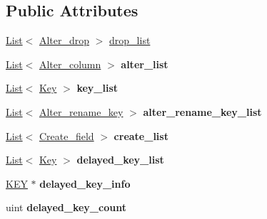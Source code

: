 \subsection*{Public Attributes}
\begin{DoxyCompactItemize}
\item 
\mbox{\hyperlink{classList}{List}}$<$ \mbox{\hyperlink{classAlter__drop}{Alter\+\_\+drop}} $>$ \mbox{\hyperlink{classAlter__info_a4bc7d6d9511a71d514d57cd07c9cafe8}{drop\+\_\+list}}
\item 
\mbox{\label{classAlter__info_a51f2960eca8a34b31ba4093b3e95ef56}} 
\mbox{\hyperlink{classList}{List}}$<$ \mbox{\hyperlink{classAlter__column}{Alter\+\_\+column}} $>$ {\bfseries alter\+\_\+list}
\item 
\mbox{\label{classAlter__info_a5ed1d155d24bc36cea170494aebcb920}} 
\mbox{\hyperlink{classList}{List}}$<$ \mbox{\hyperlink{classKey}{Key}} $>$ {\bfseries key\+\_\+list}
\item 
\mbox{\label{classAlter__info_ac9910381b91ec581f28ab2d8f1cf9775}} 
\mbox{\hyperlink{classList}{List}}$<$ \mbox{\hyperlink{classAlter__rename__key}{Alter\+\_\+rename\+\_\+key}} $>$ {\bfseries alter\+\_\+rename\+\_\+key\+\_\+list}
\item 
\mbox{\label{classAlter__info_a6b27832b0133cbb7d771f0e20c0cd190}} 
\mbox{\hyperlink{classList}{List}}$<$ \mbox{\hyperlink{classCreate__field}{Create\+\_\+field}} $>$ {\bfseries create\+\_\+list}
\item 
\mbox{\label{classAlter__info_a43e6209b58c1cfe6649c24e3516a3c37}} 
\mbox{\hyperlink{classList}{List}}$<$ \mbox{\hyperlink{classKey}{Key}} $>$ {\bfseries delayed\+\_\+key\+\_\+list}
\item 
\mbox{\label{classAlter__info_a853d59f6102f73d64cfcfdd3c098d3f9}} 
\mbox{\hyperlink{structst__key}{K\+EY}} $\ast$ {\bfseries delayed\+\_\+key\+\_\+info}
\item 
\mbox{\label{classAlter__info_a20db5aaeb7c3c6918755f7d304b786a8}} 
uint {\bfseries delayed\+\_\+key\+\_\+count}
\item 
\mbox{\label{classAlter__info_aed0910ea63ef9795d7cca30a614cfd07}} 

\end{DoxyCompactItemize}
